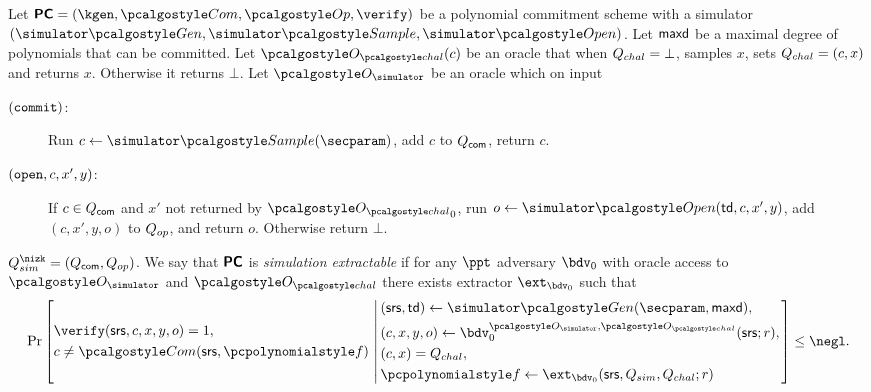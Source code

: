 \documentclass[runningheads,11pt]{llncs}
\begin{document}
\begin{definition}
  \label{def:se_bdv0}
  Let $\PCOM = (\kgen, \com, \op, \verify)$ be a polynomial commitment scheme with a
  simulator $(\simgen, \simsample, \simopen)$. Let $\mathsf{maxd}$ be a maximal degree of
  polynomials that can be committed. Let $\oraclec (c)$ be an oracle that when
  ${Q_{chal}} = \bot$, samples $x$, sets ${Q_{chal}} = (c, x)$  and
    returns $x$. Otherwise it returns $\bot$. Let $\oracles$ be an oracle which on
    input
     \begin{description}
     \item[$(\mathtt{commit})$:] Run $c \gets \simsample (\secparam)$, add $c$ to
       $Q_{\mathsf{com}}$, return $c$.
     \item[$(\mathtt{open}, c, x', y)$:] If $c \in Q_{\mathsf{com}}$ and $x'$ not returned by $\oraclec_0$, run
       $o \gets \simopen(\td, c, x', y)$, add $(c, x', y, o)$ to $Q_{op}$, and return
       $o$. Otherwise return $\bot$.
     \end{description}
     $\Qsim = (\Qcom, \Qop)$.  We say that $\bm{\mathsf{PC}}$ is \emph{simulation
       extractable} if for any $\ppt$ adversary $\bdv_0$ with oracle access to
     $\oracles$ and $\oraclec$ there exists extractor $\ext_{\bdv_0}$ such that
     \[
       \Pr \left[
         \begin{aligned}
           & \verify(\srs, c, x, y, o) = 1, \\
           & c \neq \com(\srs, \p{f})\\
         \end{aligned}
         \,\left|\, \vphantom{
             \begin{aligned}
               & \\
               & \\
               & \\
               &
             \end{aligned}
           }
           \begin{aligned}
             & (\srs, \td) \gets \simgen(\secparam, \maxdeg),\\
             & (c, x, y, o) \gets \bdv_0^{\oracles,\oraclec}(\srs; r), \\
             & (c, x) = \Qchal, \\
             & \p{f} \gets \ext_{\bdv_0}(\srs, Q_{sim}, Q_{chal}; r)
           \end{aligned}
         \right.\right] \leq \negl.
     \]
\end{definition}
\end{document}
